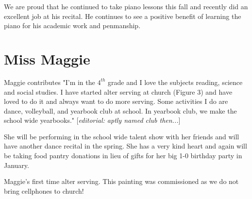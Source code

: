 \documentclass[letterpaper,11pt]{article}
\makeatletter
\newenvironment{figurehere}
  {\def\@captype{figure}}
  {}
\makeatother
\begin{document}
\begin{multicols}{2}
We are proud that he continued to take piano lessons this fall and recently did
an excellent job at his recital.  He continues to see a positive benefit of learning
the piano for his academic work and penmanship. 

\section{Miss Maggie}

Maggie contributes "I'm in the ${4}^{th}$ grade and I love the subjects reading,
science and social studies. I have started alter serving at church (Figure 3) and
have loved to do it and always want to do more serving. Some activities I do are
dance, volleyball, and yearbook club at school. In yearbook club, we make the
school wide yearbooks." [\textit{editorial: aptly named club then...}]

She will be performing in the school wide talent show with her friends and will
have another dance recital in the spring.  She has a very kind heart and again
will be taking food pantry donations in lieu of gifts for her big 1-0 birthday
party in January.

\begin{figurehere}
    \centering   
    \caption{Maggie's first time alter serving. This painting was commissioned
    as we do not bring cellphones to church!}
\end{figurehere}


\end{multicols}
\end{document}

